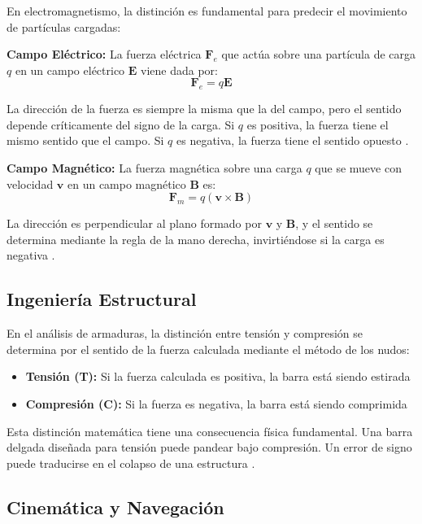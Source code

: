 \documentclass[conference]{IEEEtran}
\begin{document}
En electromagnetismo, la distinción es fundamental para predecir el movimiento de partículas cargadas:

\textbf{Campo Eléctrico:} La fuerza eléctrica $\mathbf{F}_e$ que actúa sobre una partícula de carga $q$ en un campo eléctrico $\mathbf{E}$ viene dada por:
\begin{equation}
\mathbf{F}_e = q\mathbf{E}
\end{equation}

La dirección de la fuerza es siempre la misma que la del campo, pero el sentido depende críticamente del signo de la carga. Si $q$ es positiva, la fuerza tiene el mismo sentido que el campo. Si $q$ es negativa, la fuerza tiene el sentido opuesto \cite{ehu_magnetico}.

\textbf{Campo Magnético:} La fuerza magnética sobre una carga $q$ que se mueve con velocidad $\mathbf{v}$ en un campo magnético $\mathbf{B}$ es:
\begin{equation}
\mathbf{F}_m = q(\mathbf{v} \times \mathbf{B})
\end{equation}

La dirección es perpendicular al plano formado por $\mathbf{v}$ y $\mathbf{B}$, y el sentido se determina mediante la regla de la mano derecha, invirtiéndose si la carga es negativa \cite{ehu_magnetico}.

\subsection{Ingeniería Estructural}

En el análisis de armaduras, la distinción entre tensión y compresión se determina por el sentido de la fuerza calculada mediante el método de los nudos:

\begin{itemize}
\item \textbf{Tensión (T):} Si la fuerza calculada es positiva, la barra está siendo estirada
\item \textbf{Compresión (C):} Si la fuerza es negativa, la barra está siendo comprimida
\end{itemize}

Esta distinción matemática tiene una consecuencia física fundamental. Una barra delgada diseñada para tensión puede pandear bajo compresión. Un error de signo puede traducirse en el colapso de una estructura \cite{benguria_armaduras}.

\subsection{Cinemática y Navegación}
\end{document}
